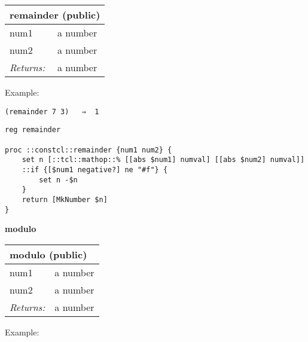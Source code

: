 \documentclass{report}
\begin{document}
\begin{tabular}{ |l l| }
\hline
\multicolumn{2}{|l|}{remainder (public)} \\
\hline
num1 & a number \\
num2 & a number \\
\textit{Returns:} & a number \\
\hline
\end{tabular}


Example:

\noindent\makebox[\linewidth]{\rule{\linewidth}{0.4pt}}
\begin{lstlisting}
(remainder 7 3)   ⇒  1
\end{lstlisting}
\noindent\makebox[\linewidth]{\rule{\linewidth}{0.4pt}}
\noindent\makebox[\linewidth]{\rule{\linewidth}{0.4pt}}
\begin{lstlisting}
reg remainder
 
proc ::constcl::remainder {num1 num2} {
    set n [::tcl::mathop::% [[abs $num1] numval] [[abs $num2] numval]]
    ::if {[$num1 negative?] ne "#f"} {
        set n -$n
    }
    return [MkNumber $n]
}
\end{lstlisting}
\noindent\makebox[\linewidth]{\rule{\linewidth}{0.4pt}}

\textbf{modulo}

\begin{tabular}{ |l l| }
\hline
\multicolumn{2}{|l|}{modulo (public)} \\
\hline
num1 & a number \\
num2 & a number \\
\textit{Returns:} & a number \\
\hline
\end{tabular}


Example:
\end{document}
